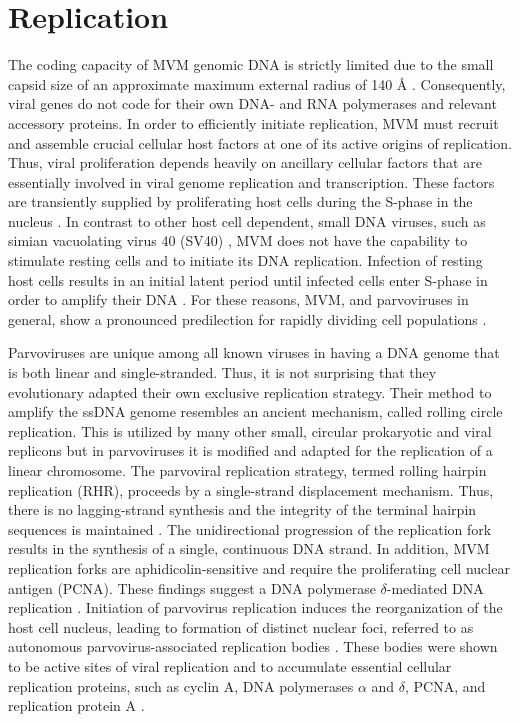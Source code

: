 \section{Replication}
\label{Replication}
The coding capacity of MVM genomic DNA is strictly limited due to the small capsid size of an approximate maximum external radius of 140 \r{A} \cite{pmid15299974}. Consequently, viral genes do not code for their own DNA- and RNA polymerases and relevant accessory proteins. In order to efficiently initiate replication, MVM must recruit and assemble crucial cellular host factors at one of its active origins of replication. Thus, viral proliferation depends heavily on ancillary cellular factors that are essentially involved in viral genome replication and transcription. These factors are transiently supplied by proliferating host cells during the S-phase in the nucleus \cite{pmid16789120, pmid6602221, pmid3005655, pmid3296697, pmid9418888, pmid4673484, S-phase}. In contrast to other host cell dependent, small DNA viruses, such as simian vacuolating virus 40 (SV40) \cite{pmid4291013, pmid16578647}, MVM does not have the capability to stimulate resting cells and to initiate its DNA replication. Infection of resting host cells results in an initial latent period until infected cells enter S-phase in order to amplify their DNA \cite{pmid4673484, pmid3346950, pmid10792046}. For these reasons, MVM, and parvoviruses in general, show a pronounced predilection for rapidly dividing cell populations \cite{pmid3296697}. 

Parvoviruses are unique among all known viruses in having a DNA genome that is both linear and single-stranded. Thus, it is not surprising that they evolutionary adapted their own exclusive replication strategy. Their method to amplify the ssDNA genome resembles an ancient mechanism, called rolling circle replication. This is utilized by many other small, circular prokaryotic and viral replicons \cite{pmid1630899, pmid8374079, pmid8824773, pmid9092519, pmid9010307} but in parvoviruses it is modified and adapted for the replication of a linear chromosome. The parvoviral replication strategy, termed rolling hairpin replication (RHR), proceeds by a single-strand displacement mechanism. Thus, there is no lagging-strand synthesis and the integrity of the terminal hairpin sequences is maintained \cite{pmid967244}. The unidirectional progression of the replication fork results in the synthesis of a single, continuous DNA strand. In addition, MVM replication forks are aphidicolin-sensitive and require the proliferating cell nuclear antigen (PCNA). These findings suggest a DNA polymerase $\delta$-mediated DNA replication \cite{pmid10792046, pmid12050365, pmid9525597}. Initiation of parvovirus replication induces the reorganization of the host cell nucleus, leading to formation of distinct nuclear foci, referred to as autonomous parvovirus-associated replication bodies \cite{pmid11287588, pmid10775619, pmid11907229}. These bodies were shown to be active sites of viral replication and to accumulate essential cellular replication proteins, such as cyclin A, DNA polymerases $\alpha$ and $\delta$, PCNA, and replication protein A \cite{pmid10792046}. 

